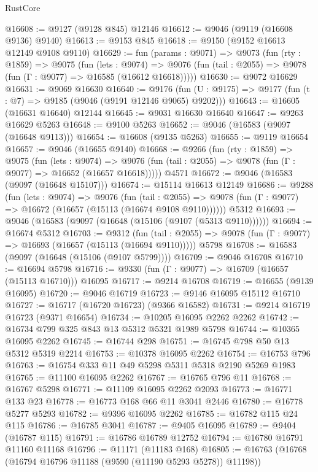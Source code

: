 \begin{lexlean}{RustCore}
\begin{coremodule}
@16608 := @9127 (@9128 @845) @12146
@16612 := @9046 (@9119 (@16608 @9136) @9140)
@16613 := @9153 @845
@16618 := @9150 (@9152 @16613 @12149 @9108 @9110)
@16629 := fun (params : @9071) =>
  @9073
    (fun (rty : @1859) =>
    @9075
      (fun (lets : @9074) =>
      @9076 (fun (tail : @2055) => @9078 (fun (Γ : @9077) => @16585 (@16612 @16618)))))
@16630 := @9072 @16629
@16631 := @9069 @16630
@16640 := @9176
    (fun (U : @9175) => @9177 (fun (t : @7) => @9185 (@9046 (@9191 @12146 @9065) @9202)))
@16643 := @16605 (@16631 @16640) @12144
@16645 := @9031 @16630 @16640
@16647 := @9263 @16629 @5263
@16648 := @9100 @5263
@16652 := @9046 (@16583 (@9097 (@16648 @9113)))
@16654 := @16608 (@9135 @5263)
@16655 := @9119 @16654
@16657 := @9046 (@16655 @9140)
@16668 := @9266
    (fun (rty : @1859) =>
    @9075
      (fun (lets : @9074) =>
      @9076 (fun (tail : @2055) => @9078 (fun (Γ : @9077) => @16652 (@16657 @16618)))))
    @4571
@16672 := @9046 (@16583 (@9097 (@16648 @15107)))
@16674 := @15114 @16613 @12149
@16686 := @9288
    (fun (lets : @9074) =>
    @9076
      (fun (tail : @2055) =>
      @9078 (fun (Γ : @9077) => @16672 (@16657 (@15113 (@16674 @9108 @9110))))))
    @5312
@16693 := @9046 (@16583 (@9097 (@16648 (@15106 (@9107 (@5313 @9110))))))
@16694 := @16674 @5312
@16703 := @9312
    (fun (tail : @2055) => @9078 (fun (Γ : @9077) => @16693 (@16657 (@15113 (@16694 @9110)))))
    @5798
@16708 := @16583 (@9097 (@16648 (@15106 (@9107 @5799))))
@16709 := @9046 @16708
@16710 := @16694 @5798
@16716 := @9330 (fun (Γ : @9077) => @16709 (@16657 (@15113 @16710))) @16095
@16717 := @9214 @16708
@16719 := @16655 (@9139 @16095)
@16720 := @9046 @16719
@16723 := @9146 @16095 @15112 @16710
@16727 := @16717 (@16720 @16723) (@9366 @16582)
@16731 := @9214 @16719 @16723 (@9371 @16654)
@16734 := @10205 @16095 @2262 @2262
@16742 := @16734 @799 @325 @843 @13 @5312 @5321 @1989 @5798
@16744 := @10365 @16095 @2262
@16745 := @16744 @298
@16751 := @16745 @798 @50 @13 @5312 @5319 @2214
@16753 := @10378 @16095 @2262
@16754 := @16753 @796
@16763 := @16754 @333 @11 @49 @5298 @5311 @5318 @2190 @5269 @1983
@16765 := @11100 @16095 @2262
@16767 := @16765 @796 @11
@16768 := @16767 @5298
@16771 := @11109 @16095 @2262 @2093
@16773 := @16771 @133 @23
@16778 := @16773 @168 @66 @11 @3041 @2446
@16780 := @16778 @5277 @5293
@16782 := @9396 @16095 @2262
@16785 := @16782 @115 @24 @115
@16786 := @16785 @3041
@16787 := @9405 @16095
@16789 := @9404 (@16787 @115)
@16791 := @16786 @16789 @12752
@16794 := @16780 @16791 @11160 @11168
@16796 := @11171 (@11183 @168)
@16805 := @16763 (@16768 (@16794 @16796 @11188 (@9590 (@11190 @5293 @5278)) @11198))

\end{coremodule}
\end{lexlean}

